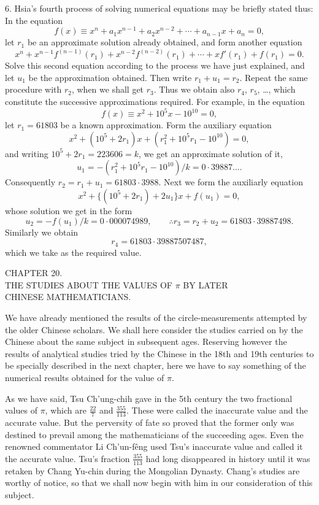 \documentclass[11pt]{article}
\newcommand{\scanpage}[2]{\clearpage\setcounter{footnote}{0}\noindent{\footnotesize\color{gray}PDF page #1 · #2}\par\medskip}
\newcommand{\scanfooter}{}
\begin{document}
6. Hsia's fourth process of solving numerical equations may be briefly stated thus: In the equation
\[
f(x)\equiv x^n+a_1x^{n-1}+a_2x^{n-2}+\cdots+a_{n-1}x+a_n=0,
\]
let $r_1$ be an approximate solution already obtained, and form another equation
\[
x^n+x^{n-1}f^{(n-1)}(r_1)+x^{n-2}f^{(n-2)}(r_1)+\cdots+xf'(r_1)+f(r_1)=0.
\]
Solve this second equation according to the process we have just explained, and let $u_1$ be the approximation obtained. Then write $r_1+u_1=r_2$. Repeat the same procedure with $r_2$, when we shall get $r_3$. Thus we obtain also $r_4$, $r_5$, \ldots, which constitute the successive approximations required. For example, in the equation
\[
f(x)\equiv x^2+10^5x-10^{10}=0,
\]
let $r_1=61803$ be a known approximation. Form the auxiliary equation
\[
x^2+(10^5+2r_1)x+(r_1^2+10^5r_1-10^{10})=0,
\]
and writing $10^5+2r_1=223606=k$, we get an approximate solution of it,
\[
u_1=-(r_1^2+10^5r_1-10^{10})/k=0\cdot 39887\ldots.
\]
Consequently $r_2=r_1+u_1=61803\cdot 3988$. Next we form the auxiliarly equation
\[
x^2+\{(10^5+2r_1)+2u_1\}x+f(u_1)=0,
\]
whose solution we get in the form
\[
u_2=-f(u_1)/k=0\cdot 000074989,
\qquad \therefore r_3=r_2+u_2=61803\cdot 39887498.
\]
Similarly we obtain
\[
r_4=61803\cdot 39887507487,
\]
which we take as the required value.
\scanfooter

\scanpage{0149}{Chapter 20 opening, printed page 135}
\begin{center}
CHAPTER 20.\\
THE STUDIES ABOUT THE VALUES OF $\pi$ BY LATER\\
CHINESE MATHEMATICIANS.
\end{center}

We have already mentioned the results of the circle-measurements attempted by the older Chinese scholars. We shall here consider the studies carried on by the Chinese about the same subject in subsequent ages. Reserving however the results of analytical studies tried by the Chinese in the 18th and 19th centuries to be specially described in the next chapter, here we have to say something of the numerical results obtained for the value of $\pi$.

As we have said, Tsu Ch'ung-chih gave in the 5th century the two fractional values of $\pi$, which are $\frac{22}{7}$ and $\frac{355}{113}$. These were called the inaccurate value and the accurate value. But the perversity of fate so proved that the former only was destined to prevail among the mathematicians of the succeeding ages. Even the renowned commentator Li Ch'un-fêng used Tsu's inaccurate value and called it the accurate value. Tsu's fraction $\frac{355}{113}$ had long disappeared in history until it was retaken by Chang Yu-chin during the Mongolian Dynasty. Chang's studies are worthy of notice, so that we shall now begin with him in our consideration of this subject.
\end{document}

